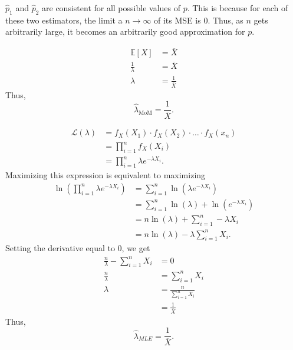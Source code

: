 \documentclass[12pt]{article}
\begin{document}
\newpage
{} $\hat p_1$ and $\hat p_2$ are consistent for all possible values of $p$. This is because for each of these two estimators, the limit a $n \to \infty$ of its MSE is 0. Thus, as $n$ gets arbitrarily large, it becomes an arbitrarily good approximation for $p$.

\newpage
{}

\medskip
{}
\begin{align*}
    \mathbb E[X] &= \overline X \\
    \frac1\lambda &= \overline X \\
    \lambda &= \frac{1}{\overline X}
\end{align*} Thus, \[\hat{\lambda}_{\text{MoM}} = \frac1{\overline X}.\]

\newpage
{}
\begin{align*}
    \mathcal L(\lambda) &= f_X(X_1) \cdot f_X(X_2) \cdot \hdots \cdot f_X(x_n) \\
                        &= \prod_{i=1}^n f_X(X_i) \\
                        &= \prod_{i=1}^n \lambda e^{-\lambda X_i}.
\end{align*} Maximizing this expression is equivalent to maximizing
\begin{align*}
    \ln\left(\prod_{i=1}^n \lambda e^{-\lambda X_i}\right) &= \sum_{i=1}^n \ln\left(\lambda e^{-\lambda X_i}\right) \\
                                                           &= \sum_{i=1}^n \ln(\lambda) + \ln\left(e^{-\lambda X_i}\right) \\
                                                           &= n\ln(\lambda) + \sum_{i=1}^n -\lambda X_i \\
                                                           &= n\ln(\lambda) - \lambda \sum_{i=1}^n X_i.
\end{align*}
Setting the derivative equal to 0, we get
\begin{align*}
    \frac n\lambda - \sum_{i=1}^n X_i &= 0 \\
    \frac n\lambda &= \sum_{i=1}^n X_i \\
    \lambda &= \frac n{\sum\limits_{i=1}^n X_i} \\
            &= \frac 1{\overline X}
\end{align*} Thus, \[\hat\lambda_{MLE} = \frac1{\overline X}.\]

\newpage
{}
\end{document}
